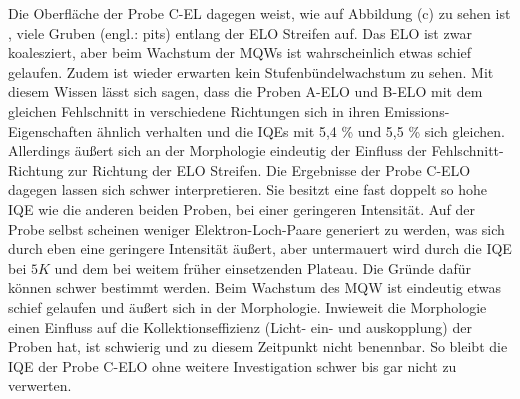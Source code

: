 Die Oberfläche der Probe C-EL dagegen weist, wie auf Abbildung (c) zu sehen ist , viele Gruben (engl.: pits) entlang der ELO Streifen auf. Das ELO ist zwar koalesziert, aber beim Wachstum der MQWs ist wahrscheinlich etwas schief gelaufen. Zudem ist wieder erwarten kein Stufenbündelwachstum zu sehen. Mit diesem Wissen lässt sich sagen, dass die Proben A-ELO und B-ELO mit dem gleichen Fehlschnitt in verschiedene Richtungen sich in ihren Emissions-Eigenschaften ähnlich verhalten und die IQEs mit 5,4 \% und 5,5 \% sich gleichen. Allerdings äußert sich an der Morphologie eindeutig der Einfluss der Fehlschnitt-Richtung zur Richtung der ELO Streifen.
Die Ergebnisse der Probe C-ELO dagegen lassen sich schwer interpretieren. Sie besitzt eine fast doppelt so hohe IQE wie die anderen beiden Proben, bei einer geringeren Intensität. Auf der Probe selbst scheinen weniger Elektron-Loch-Paare generiert zu werden, was sich durch eben eine geringere Intensität äußert, aber untermauert wird durch die IQE bei $5K$ und dem bei weitem früher einsetzenden Plateau. Die Gründe dafür können schwer bestimmt werden. Beim Wachstum des MQW ist eindeutig etwas schief gelaufen und äußert sich in der Morphologie. Inwieweit die Morphologie einen Einfluss auf die Kollektionseffizienz (Licht- ein- und auskopplung) der 
Proben hat, ist schwierig und zu diesem Zeitpunkt nicht benennbar. So bleibt die IQE der Probe C-ELO ohne weitere Investigation schwer bis gar nicht zu verwerten.


